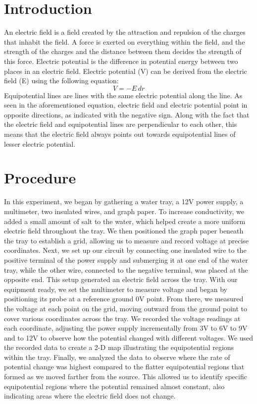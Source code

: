\documentclass[conference]{IEEEtran}
\begin{document}
\section{Introduction}
An electric field is a field created by the attraction and repulsion of the charges that inhabit the field. A force is exerted on everything within the field, and the strength of the charges and the distance between them decides the strength of this force. Electric potential is the difference in potential energy between two places in an electric field. Electric potential (V) can be derived from the electric field (E) using the following equation:
\begin{equation}
V = -E \, dr
\end{equation}
Equipotential lines are lines with the same electric potential along the line. As seen in the aforementioned equation, electric field and electric potential point in opposite directions, as indicated with the negative sign. Along with the fact that the electric field and equipotential lines are perpendicular to each other, this means that the electric field always points out towards equipotential lines of lesser electric potential.

\section{Procedure}
In this experiment, we began by gathering a water tray, a 12V power supply, a multimeter, two insulated wires, and graph paper. To increase conductivity, we added a small amount of salt to the water, which helped create a more uniform electric field throughout the tray. We then positioned the graph paper beneath the tray to establish a grid, allowing us to measure and record voltage at precise coordinates. Next, we set up our circuit by connecting one insulated wire to the positive terminal of the power supply and submerging it at one end of the water tray, while the other wire, connected to the negative terminal, was placed at the opposite end. This setup generated an electric field across the tray. With our equipment ready, we set the multimeter to measure voltage and began by positioning its probe at a reference ground 0V point. From there, we measured the voltage at each point on the grid, moving outward from the ground point to cover various coordinates across the tray. We recorded the voltage readings at each coordinate, adjusting the power supply incrementally from 3V to 6V to 9V and to 12V to observe how the potential changed with different voltages. We used the recorded data to create a 2-D map illustrating the equipotential regions within the tray. Finally, we analyzed the data to observe where the rate of potential change was highest compared to the flatter equipotential regions that formed as we moved farther from the source. This allowed us to identify specific equipotential regions where the potential remained almost constant, also indicating areas where the electric field does not change.
\end{document}
